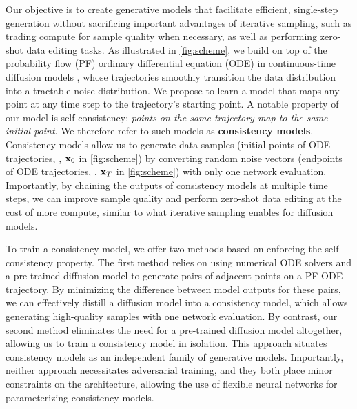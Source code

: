 Our objective is to create generative models that facilitate efficient, single-step generation without sacrificing important advantages of iterative sampling, such as trading compute for sample quality when necessary, as well as performing zero-shot data editing tasks. As illustrated in \cref{fig:scheme}, we build on top of the probability flow (PF) ordinary differential equation (ODE) in continuous-time diffusion models \cite{song2021scorebased}, whose trajectories smoothly transition the data distribution into a tractable noise distribution. We propose to learn a model that maps any point at any time step to the trajectory's starting point. A notable property of our model is self-consistency: \emph{points on the same trajectory map to the same initial point}. We therefore refer to such models as \textbf{consistency models}. Consistency models allow us to generate data samples (initial points of ODE trajectories, \eg, ${\mathbf{x}}_0$ in \cref{fig:scheme}) by converting random noise vectors (endpoints of ODE trajectories, \eg, ${\mathbf{x}}_T$ in \cref{fig:scheme}) with only one network evaluation. Importantly, by chaining the outputs of consistency models at multiple time steps, we can improve sample quality and perform zero-shot data editing at the cost of more compute, similar to what iterative sampling enables for diffusion models.


To train a consistency model, we offer two methods based on enforcing the self-consistency property. The first method relies on using numerical ODE solvers and a pre-trained diffusion model to generate pairs of adjacent points on a PF ODE trajectory. By minimizing the difference between model outputs for these pairs, we can effectively distill a diffusion model into a consistency model, which allows generating high-quality samples with one network evaluation. By contrast, our second method eliminates the need for a pre-trained diffusion model altogether, allowing us to train a consistency model in isolation. This approach situates consistency models as an independent family of generative models. Importantly, neither approach necessitates adversarial training, and they both place minor constraints on the architecture, allowing the use of flexible neural networks for parameterizing consistency models.

